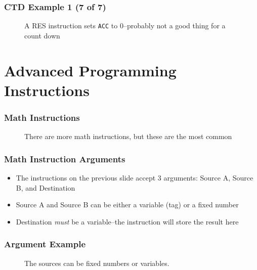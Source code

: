 \begin{frame}
    \frametitle{CTD Example 1 (7 of 7)}

    \begin{figure}
        \centering
        \resizebox{0.875\linewidth}{!}{
            
        }

        \vspace{0.5em}
        {\footnotesize A RES instruction sets \texttt{ACC} to 0--probably not a good thing for a count down\par}
    \end{figure}
\end{frame}

\section{Advanced Programming Instructions}

\begin{frame}
    \frametitle{Math Instructions}

    \begin{figure}
        \centering
        \resizebox{0.625\linewidth}{!}{
            
        }

        \vspace{0.5em}
        {\footnotesize There are more math instructions, but these are the most common\par}
    \end{figure}
\end{frame}

\begin{frame}
    \frametitle{Math Instruction Arguments}

    \begin{itemize}
        \item The instructions on the previous slide accept 3 arguments: Source A, Source B, and Destination
        \item Source A and Source B can be either a variable (tag) or a fixed number
        \item Destination \emph{must} be a variable--the instruction will store the result here
    \end{itemize}
\end{frame}

\begin{frame}
    \frametitle{Argument Example}

    \begin{figure}
        \centering
        

        \vspace{0.5em}
        {\footnotesize The sources can be fixed numbers or variables.\par}
    \end{figure}
\end{frame}

